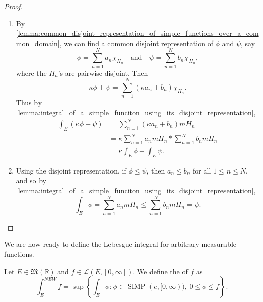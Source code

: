 \documentclass[notoc,notitlepage]{tufte-book}
\DeclareMathOperator{\SIMP}{SIMP}
\begin{document}
\begin{proof}
  \begin{enumerate}
    \item By
      \cref{lemma:common_disjoint_representation_of_simple_functions_over_a_common_domain},
      we can find a common disjoint representation of $\phi$ and $\psi$, say
      \begin{equation*}
        \phi = \sum_{n=1}^{N} a_n \chi_{H_n} \quad \text{and} \quad
        \psi = \sum_{n=1}^{N} b_n \chi_{H_n},
      \end{equation*}
      where the $H_n$'s are pairwise disjoint. Then
      \begin{equation*}
        \kappa \phi + \psi = \sum_{n=1}^{N} (\kappa a_n + b_n) \chi_{H_n}.
      \end{equation*}
      Thus by
      \cref{lemma:integral_of_a_simple_funciton_using_its_disjoint_representation},
      \begin{align*}
        \int_{E} (\kappa \phi + \psi)
        &= \sum_{n=1}^{N} (\kappa a_n + b_n) m H_n \\
        &= \kappa \sum_{n=1}^{N} a_n mH_n * \sum_{n=1}^{N} b_n mH_n \\
        &= \kappa \int_{E} \phi + \int_{E} \psi.
      \end{align*}

    \item Using the disjoint representation, if $\phi \leq \psi$, then $a_n \leq
      b_n$ for all $1 \leq n \leq N$, and so by
      \cref{lemma:integral_of_a_simple_funciton_using_its_disjoint_representation},
      \begin{equation*}
        \int_{E} \phi = \sum_{n=1}^{N} a_n mH_n \leq \sum_{n=1}^{N} b_n mH_n =
        \psi.
      \end{equation*}
  \end{enumerate}
\end{proof}

We are now ready to define the Lebesgue integral for arbitrary measurable
functions.

\begin{defn}\label{defn:lebesgue_integral}
  Let $E \in \mathfrak{M}(\mathbb{R})$ and $f \in \mathcal{L}(E, [0, \infty])$.
  We define the  of $f$ as
  \begin{equation*}
    \int_{E}^{NEW} f = \sup \left\{ \int_{E} \phi : \phi \in \SIMP(e, [0,
    \infty)),\, 0 \leq \phi \leq f \right\}.
  \end{equation*}
\end{defn}
\end{document}
